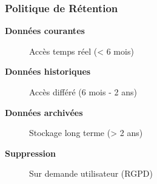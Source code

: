 \subsubsection{Politique de Rétention}

\begin{description}
    \item[\textbf{Données courantes}] Accès temps réel (< 6 mois)
    \item[\textbf{Données historiques}] Accès différé (6 mois - 2 ans)
    \item[\textbf{Données archivées}] Stockage long terme (> 2 ans)
    \item[\textbf{Suppression}] Sur demande utilisateur (RGPD)
\end{description}